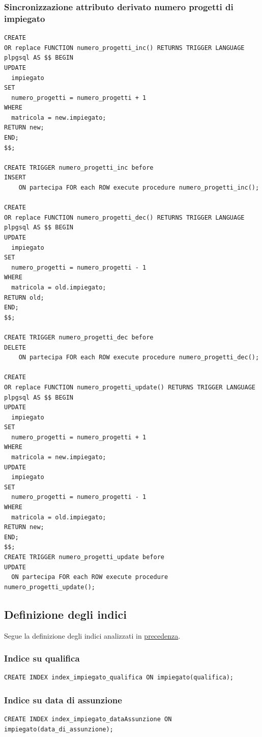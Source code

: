 \documentclass{article}
\begin{document}
\subsubsection{Sincronizzazione attributo derivato numero progetti di impiegato}
\begin{verbatim}
CREATE 
OR replace FUNCTION numero_progetti_inc() RETURNS TRIGGER LANGUAGE plpgsql AS $$ BEGIN 
UPDATE 
  impiegato 
SET 
  numero_progetti = numero_progetti + 1 
WHERE 
  matricola = new.impiegato;
RETURN new;
END;
$$;

CREATE TRIGGER numero_progetti_inc before 
INSERT 
    ON partecipa FOR each ROW execute procedure numero_progetti_inc();

CREATE 
OR replace FUNCTION numero_progetti_dec() RETURNS TRIGGER LANGUAGE plpgsql AS $$ BEGIN 
UPDATE 
  impiegato 
SET 
  numero_progetti = numero_progetti - 1 
WHERE 
  matricola = old.impiegato;
RETURN old;
END;
$$;

CREATE TRIGGER numero_progetti_dec before 
DELETE 
    ON partecipa FOR each ROW execute procedure numero_progetti_dec();

CREATE 
OR replace FUNCTION numero_progetti_update() RETURNS TRIGGER LANGUAGE plpgsql AS $$ BEGIN 
UPDATE 
  impiegato 
SET 
  numero_progetti = numero_progetti + 1 
WHERE 
  matricola = new.impiegato;
UPDATE 
  impiegato 
SET 
  numero_progetti = numero_progetti - 1 
WHERE 
  matricola = old.impiegato;
RETURN new;
END;
$$;
CREATE TRIGGER numero_progetti_update before 
UPDATE 
  ON partecipa FOR each ROW execute procedure numero_progetti_update();
\end{verbatim}

\newpage

\subsection{Definizione degli indici}
Segue la definizione degli indici analizzati in \hyperlink{page.17}{precedenza}.

\subsubsection{Indice su qualifica}
\begin{verbatim}
CREATE INDEX index_impiegato_qualifica ON impiegato(qualifica);

\end{verbatim}

\subsubsection{Indice su data di assunzione}
\begin{verbatim}
CREATE INDEX index_impiegato_dataAssunzione ON impiegato(data_di_assunzione);

\end{verbatim}
\end{document}
